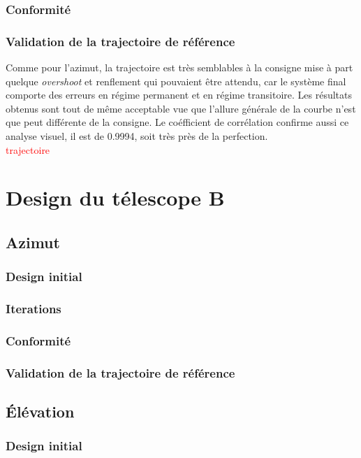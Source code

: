 \documentclass{udes_rapport} %
\begin{document}
\subsubsection{Conformité}
\subsubsection{Validation de la trajectoire de référence}
Comme pour l'azimut, la trajectoire est très semblables à la consigne mise à part quelque \textit{overshoot} et renflement qui pouvaient être attendu, car  le système final comporte des erreurs en régime permanent et en régime transitoire. Les résultats obtenus sont tout de même acceptable vue que l'allure générale de la courbe n'est que peut différente de la consigne. Le coéfficient de corrélation confirme aussi ce analyse visuel, il est de 0.9994, soit très près de la perfection.
\\
\textcolor{red}{trajectoire}
\\
\section{Design du télescope B}
\subsection{Azimut}
\subsubsection{Design initial}
\subsubsection{Iterations}

\subsubsection{Conformité}
\subsubsection{Validation de la trajectoire de référence}
\subsection{Élévation}
\subsubsection{Design initial}
\end{document}
